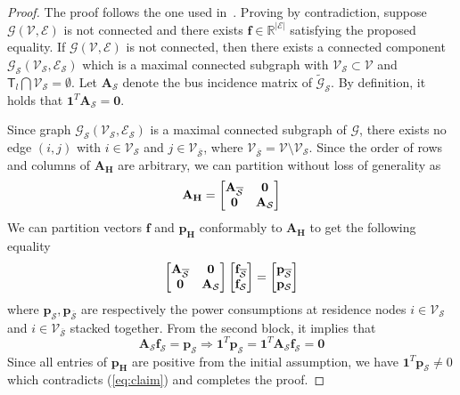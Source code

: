 \documentclass[sigconf]{acmart}
\begin{document}
\begin{proof}
	The proof follows the one used in~\cite{manish2019}. Proving by contradiction, suppose $\mathcal{G}(\mathcal{V},\mathcal{E})$ is not connected and there exists $\mathbf{f}\in\mathbb{R}^{|\mathcal{E}|}$ satisfying the proposed equality. If $\mathcal{G}(\mathcal{V},\mathcal{E})$ is not connected, then there exists a connected component $\mathcal{G}_{\mathcal{S}}(\mathcal{V}_{\mathcal{S}},\mathcal{E}_{\mathcal{S}})$ which is a maximal connected subgraph with $\mathcal{V}_{\mathcal{S}}\subset\mathcal{V}$ and $\mathsf{T}_l\bigcap\mathcal{V}_\mathcal{S}=\emptyset$. Let $\mathbf{A}_\mathcal{S}$ denote the bus incidence matrix of $\tilde{\mathcal{G}}_{\mathcal{S}}$. By definition, it holds that $\mathbf{1}^T\mathbf{A}_\mathcal{S}=\mathbf{0}$.
	
	Since graph $\mathcal{G}_{\mathcal{S}}(\mathcal{V}_{\mathcal{S}},\mathcal{E}_{\mathcal{S}})$ is a maximal connected subgraph of $\mathcal{G}$, there exists no edge $(i,j)$ with $i\in\mathcal{V}_\mathcal{S}$ and $j\in\mathcal{V}_{\overline{\mathcal{S}}}$, where $\mathcal{V}_{\overline{\mathcal{S}}}=\mathcal{V}\setminus\mathcal{V}_{\mathcal{S}}$. Since the order of rows and columns of $\mathbf{A_H}$ are arbitrary, we can partition without loss of generality as
	\begin{equation}
	\mathbf{A_H}=\begin{bmatrix}\mathbf{A}_{\overline{\mathcal{S}}}&\mathbf{0}\\\mathbf{0}&\mathbf{A}_{\mathcal{S}}\end{bmatrix}\notag
	\end{equation}
	We can partition vectors $\mathbf{f}$ and $\mathbf{p_H}$ conformably to $\mathbf{A_H}$ to get the following equality
	\begin{equation}
	\begin{bmatrix}\mathbf{A}_{\overline{\mathcal{S}}}&\mathbf{0}\\\mathbf{0}&\mathbf{A}_{\mathcal{S}}\end{bmatrix}\begin{bmatrix}\mathbf{f}_{\overline{\mathcal{S}}}\\\mathbf{f}_{\mathcal{S}}\end{bmatrix}=\begin{bmatrix}\mathbf{p}_{{\overline{\mathcal{S}}}}\\\mathbf{p}_{\mathcal{S}}\end{bmatrix}\notag
	\end{equation}
	where $\mathbf{p}_{\mathcal{S}},\mathbf{p}_{{\overline{\mathcal{S}}}}$ are respectively the power consumptions at residence nodes $i\in\mathcal{V}_\mathcal{S}$ and  $i\in\mathcal{V}_{\overline{\mathcal{S}}}$ stacked together. From the second block, it implies that 
	\begin{equation}
	\mathbf{A}_{\mathcal{S}}\mathbf{f}_{\mathcal{S}}=\mathbf{p}_{\mathcal{S}}\Rightarrow \mathbf{1}^T\mathbf{p}_{\mathcal{S}}=\mathbf{1}^T\mathbf{A}_{\mathcal{S}}\mathbf{f}_{\mathcal{S}}=\mathbf{0}\label{eq:claim}
	\end{equation}
	Since all entries of $\mathbf{p_H}$ are positive from the initial assumption, we have $\mathbf{1}^T\mathbf{p}_{\mathcal{S}}\neq0$ which contradicts (\ref{eq:claim}) and completes the proof. 
\end{proof}
\end{document}
